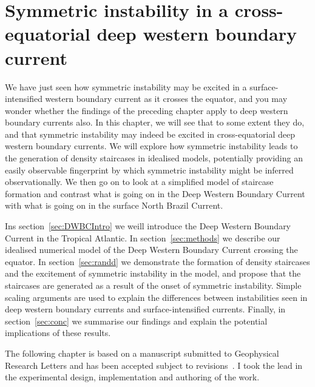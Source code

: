 \chapter{Symmetric instability in a cross-equatorial deep western boundary current}
\label{chap:4}

We have just seen how symmetric instability may be excited in a surface-intensified western boundary current as it crosses the equator, and you may wonder whether the findings of the preceding chapter apply to deep western boundary currents also. In this chapter, we will see that to some extent they do, and that symmetric instability may indeed be excited in cross-equatorial deep western boundary currents. We will explore how symmetric instability leads to the generation of density staircases in idealised models, potentially providing an easily observable fingerprint by which symmetric instability might be inferred observationally. We then go on to look at a simplified model of staircase formation and contrast what is going on in the Deep Western Boundary Current with what is going on in the surface North Brazil Current.

Ins section~\ref{sec:DWBCIntro} we weill introduce the Deep Western Boundary Current in the Tropical Atlantic. In section~\ref{sec:methods} we describe our idealised numerical model of the Deep Western Boundary Current crossing the equator. In section~\ref{sec:randd} we demonstrate the formation of density staircases and the excitement of symmetric instability in the model, and propose that the staircases are generated as a result of the onset of symmetric instability. Simple scaling arguments are used to explain the differences between instabilities seen in deep western boundary currents and surface-intensified currents. Finally, in section~\ref{sec:conc} we summarise our findings and explain the potential implications of these results.

The following chapter is based on a manuscript submitted to Geophysical Research Letters and has been accepted subject to revisions~\citep{Goldsworth2022}. I took the lead in the experimental design, implementation and authoring of the work.

